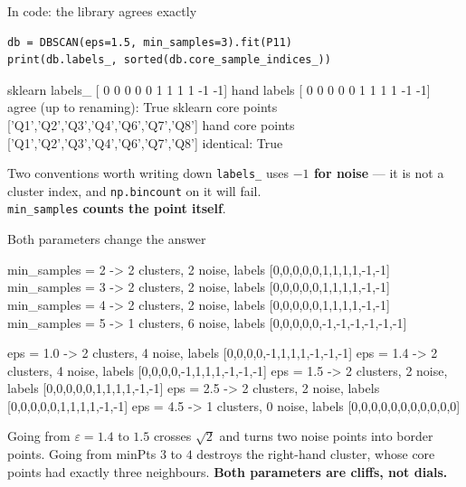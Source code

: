 \documentclass[aspectratio=169]{beamer}
\begin{document}
\begin{frame}[fragile,shrink=6]{In code: the library agrees exactly}
\begin{lstlisting}[basicstyle=\ttfamily\scriptsize]
db = DBSCAN(eps=1.5, min_samples=3).fit(P11)
print(db.labels_, sorted(db.core_sample_indices_))
\end{lstlisting}
\begin{outblk}
sklearn labels_       [ 0  0  0  0  0  1  1  1  1 -1 -1]
hand labels           [ 0  0  0  0  0  1  1  1  1 -1 -1]
agree (up to renaming): True
sklearn core points   ['Q1','Q2','Q3','Q4','Q6','Q7','Q8']
hand core points      ['Q1','Q2','Q3','Q4','Q6','Q7','Q8']
identical: True
\end{outblk}
  \vspace{0.3em}
  \begin{alertblock}{Two conventions worth writing down}
    \centering\small
    \texttt{labels\_} uses \textbf{$-1$ for noise} --- it is not a cluster
    index, and \texttt{np.bincount} on it will fail. \\
    \texttt{min\_samples} \textbf{counts the point itself}.
  \end{alertblock}
\end{frame}

\begin{frame}[fragile,shrink=8]{Both parameters change the answer}
\begin{outblk}
  min_samples = 2  ->  2 clusters, 2 noise, labels [0,0,0,0,0,1,1,1,1,-1,-1]
  min_samples = 3  ->  2 clusters, 2 noise, labels [0,0,0,0,0,1,1,1,1,-1,-1]
  min_samples = 4  ->  2 clusters, 2 noise, labels [0,0,0,0,0,1,1,1,1,-1,-1]
  min_samples = 5  ->  1 clusters, 6 noise, labels [0,0,0,0,0,-1,-1,-1,-1,-1,-1]

  eps = 1.0  ->  2 clusters, 4 noise, labels [0,0,0,0,-1,1,1,1,-1,-1,-1]
  eps = 1.4  ->  2 clusters, 4 noise, labels [0,0,0,0,-1,1,1,1,-1,-1,-1]
  eps = 1.5  ->  2 clusters, 2 noise, labels [0,0,0,0,0,1,1,1,1,-1,-1]
  eps = 2.5  ->  2 clusters, 2 noise, labels [0,0,0,0,0,1,1,1,1,-1,-1]
  eps = 4.5  ->  1 clusters, 0 noise, labels [0,0,0,0,0,0,0,0,0,0,0]
\end{outblk}
  \vspace{0.2em}
  \begin{center}\small
    Going from $\varepsilon = 1.4$ to $1.5$ crosses $\sqrt{2}$ and turns two
    noise points into border points. Going from minPts $3$ to $4$ destroys
    the right-hand cluster, whose core points had exactly three neighbours.
    \textbf{Both parameters are cliffs, not dials.}
  \end{center}
\end{frame}
\end{document}
